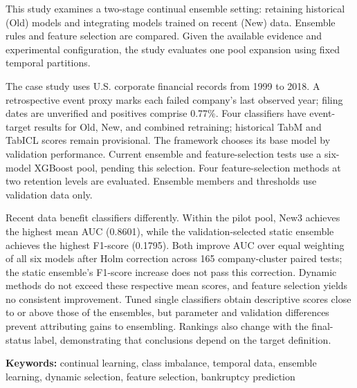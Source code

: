 This study examines a two-stage continual ensemble setting: retaining historical (Old) models and integrating models trained on recent (New) data. Ensemble rules and feature selection are compared. Given the available evidence and experimental configuration, the study evaluates one pool expansion using fixed temporal partitions.

The case study uses U.S. corporate financial records from 1999 to 2018. A retrospective event proxy marks each failed company's last observed year; filing dates are unverified and positives comprise 0.77\%. Four classifiers have event-target results for Old, New, and combined retraining; historical TabM and TabICL scores remain provisional. The framework chooses its base model by validation performance. Current ensemble and feature-selection tests use a six-model XGBoost pool, pending this selection. Four feature-selection methods at two retention levels are evaluated. Ensemble members and thresholds use validation data only.

Recent data benefit classifiers differently. Within the pilot pool, New3 achieves the highest mean AUC (0.8601), while the validation-selected static ensemble achieves the highest F1-score (0.1795). Both improve AUC over equal weighting of all six models after Holm correction across 165 company-cluster paired tests; the static ensemble's F1-score increase does not pass this correction. Dynamic methods do not exceed these respective mean scores, and feature selection yields no consistent improvement. Tuned single classifiers obtain descriptive scores close to or above those of the ensembles, but parameter and validation differences prevent attributing gains to ensembling. Rankings also change with the final-status label, demonstrating that conclusions depend on the target definition.

\noindent\textbf{Keywords:} continual learning, class imbalance, temporal data, ensemble learning, dynamic selection, feature selection, bankruptcy prediction
